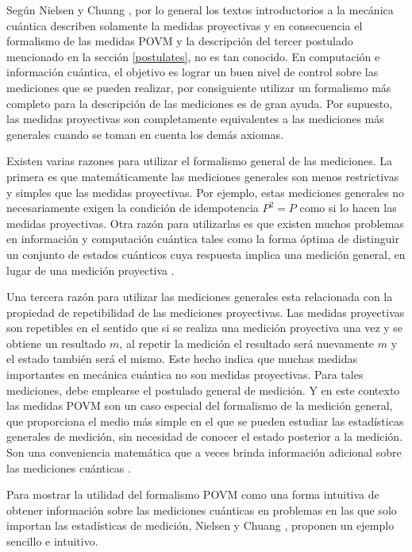 Según Nielsen y Chuang {\cite{nielsen_chuang_2010}}, por lo general los textos
introductorios a la mecánica cuántica describen solamente la medidas
proyectivas y en consecuencia el formalismo de las medidas POVM y la
descripción del tercer postulado mencionado en la sección {\ref{postulates}},
no es tan conocido. En computación e información cuántica, el objetivo es
lograr un buen nivel de control sobre las mediciones que se pueden realizar,
por consiguiente utilizar un formalismo más completo para la descripción de las
mediciones es de gran ayuda. Por supuesto, las medidas proyectivas son
completamente equivalentes a las mediciones más generales cuando se toman en
cuenta los demás axiomas.


Existen varias razones para utilizar el formalismo general de las mediciones. La primera es que matemáticamente las mediciones generales son menos restrictivas y simples que las medidas proyectivas. Por ejemplo, estas mediciones generales no necesariamente exigen la condición de idempotencia $P^2=P$ como si lo hacen las medidas proyectivas. Otra razón para utilizarlas es que existen muchos problemas en información y computación cuántica tales como la forma óptima de distinguir un conjunto de estados cuánticos cuya respuesta implica una medición general, en lugar de una medición proyectiva {\cite{nielsen_chuang_2010}}.


Una tercera razón para utilizar las mediciones generales esta relacionada con la propiedad de repetibilidad de las mediciones proyectivas. Las medidas proyectivas son repetibles en el sentido que si se realiza una medición proyectiva una vez y se obtiene un resultado $m$, al repetir la medición el resultado será nuevamente $m$ y el estado también será el mismo. Este hecho indica que muchas medidas importantes en mecánica cuántica no son medidas proyectivas.  Para tales mediciones, debe emplearse el postulado general de medición. Y en este contexto las medidas POVM son un caso especial del formalismo de la medición general, que proporciona el medio más simple en el que se pueden estudiar las estadísticas generales de medición, sin necesidad de conocer el estado posterior a la medición. Son una conveniencia matemática que a veces brinda información adicional sobre las mediciones cuánticas {\cite{nielsen_chuang_2010}}.


Para mostrar la utilidad del formalismo POVM como una forma intuitiva de
obtener información sobre las mediciones cuánticas en problemas en las que solo
importan las estadísticas de medición, Nielsen y Chuang
{\cite{nielsen_chuang_2010}}, proponen un ejemplo sencillo e intuitivo.

